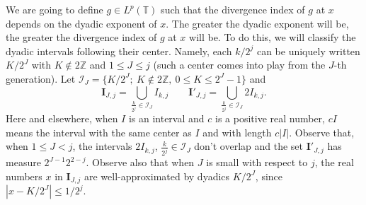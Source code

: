 \documentclass[11pt,a4paper]{amsart}
\theoremstyle{plain}
\begin{document}
We are going to define $g\in L^p({\mathbb T})$ such that the divergence index of $g$ at $x$ depends on the dyadic exponent of $x$. The greater the dyadic exponent will be, the greater the divergence index of $g$ at $x$ will be. To do this, we will classify the dyadic intervals following their center. Namely, each $k/2^j$ can be uniquely written $K/2^J$
with $K\notin 2\mathbb Z$ and $1\leq J\leq j$ (such a center comes into play from the $J$-th generation). Let 
$\mathcal I_J=\{K/2^J;\ K\notin 2\mathbb Z,\ 0\leq K\leq 2^{J}-1\}$ and 
$$\mathbf I_{J,j}=\bigcup_{\frac{k}{2^j}\in\mathcal I_J}I_{k,j}\quad\quad \mathbf I'_{J,j}=\bigcup_{\frac{k}{2^j}\in\mathcal I_J}2I_{k,j}.$$
Here and elsewhere, when $I$ is an interval and $c$ is a positive real number, $c I$ means the interval with the same
center as $I$
and with length $c |I|$. Observe that, when  $1\le J<j$, the intervals
$2I_{k,j}$, $\frac{k}{2^j}\in\mathcal I_J$ don't overlap and the set $\mathbf I'_{J,j}$ has measure
$2^{J-1}2^{2-j}$. Observe also that when $J$ is small with respect to
$j$, the real numbers $x$ in $\mathbf I_{J,j}$ 
are well-approximated by dyadics $K/2^J$, since $|x-K/2^J|\leq 1/2^j$.
 
\end{document}
